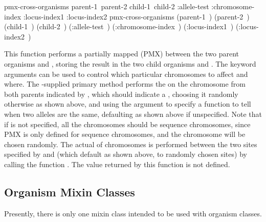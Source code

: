 {\filbreak
{\samepage
\Defgeneric pmx-cross-organisms {\hbox{parent-1 parent-2} \hbox{child-1 child-2}
                         \key :allele-test :chromosome-index :locus-index1 :locus-index2}
 pmx-cross-organisms {\hbox{(parent-1 )}
                                \hbox{(parent-2 )}
                                \hbox{(child-1 )}
                                \hbox{(child-2 )}
    \key \hbox{(:allele-test )}
         \hbox{(:chromosome-index )}
         \hbox{(:locus-index1 )}
         \hbox{(:locus-index2 )}}

This function performs a partially mapped  (PMX)
\cite{ga:goldberg} between the two parent organisms  and
, storing the result in the two child organisms  and
. The keyword arguments can be used to control which particular
chromosomes to affect and where. The \geco-supplied primary method performs the
 on the chromosome from both parents indicated by ,
which should indicate a , choosing it randomly
otherwise as shown above, and using the  argument to specify a
function to tell when two alleles are the same, defaulting as shown above if
unspecified. Note that if  is not specified, all the
chromosomes should be sequence chromosomes, since PMX is only defined for sequence
chromosomes, and the chromosome will be chosen randomly. The actual  of
chromosomes is performed between the two sites specified by  and
 (which default as shown above, to randomly chosen sites) by
calling the function .
The value returned by this function is not defined.
\par}%

\subsection{Organism Mixin Classes}	\label{sec:organism-mixin-classes}

Presently, there is only one mixin class intended to be used with organism classes.

}
